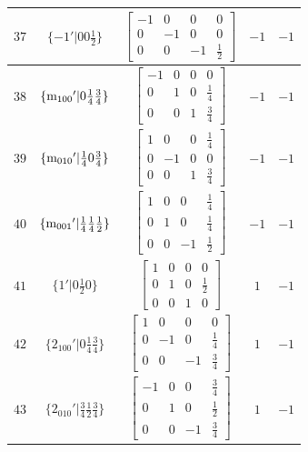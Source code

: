 \documentclass[fleqn,8pt]{jsarticle}
\begin{document}
\begin{longtable}{ccccc}
$ 37 $ & $ \{-1{}'|0 0 \frac{1}{2}\} $ & $ \begin{bmatrix} -1 & 0 & 0 & 0 \\ 0 & -1 & 0 & 0 \\ 0 & 0 & -1 & \frac{1}{2} \end{bmatrix} $ & $ -1 $ & $ -1 $ \\ \hline
$ 38 $ & $ \{{\rm m}_{100}{}'|0 \frac{1}{4} \frac{3}{4}\} $ & $ \begin{bmatrix} -1 & 0 & 0 & 0 \\ 0 & 1 & 0 & \frac{1}{4} \\ 0 & 0 & 1 & \frac{3}{4} \end{bmatrix} $ & $ -1 $ & $ -1 $ \\ \hline
$ 39 $ & $ \{{\rm m}_{010}{}'|\frac{1}{4} 0 \frac{3}{4}\} $ & $ \begin{bmatrix} 1 & 0 & 0 & \frac{1}{4} \\ 0 & -1 & 0 & 0 \\ 0 & 0 & 1 & \frac{3}{4} \end{bmatrix} $ & $ -1 $ & $ -1 $ \\ \hline
$ 40 $ & $ \{{\rm m}_{001}{}'|\frac{1}{4} \frac{1}{4} \frac{1}{2}\} $ & $ \begin{bmatrix} 1 & 0 & 0 & \frac{1}{4} \\ 0 & 1 & 0 & \frac{1}{4} \\ 0 & 0 & -1 & \frac{1}{2} \end{bmatrix} $ & $ -1 $ & $ -1 $ \\ \hline
$ 41 $ & $ \{1{}'|0 \frac{1}{2} 0\} $ & $ \begin{bmatrix} 1 & 0 & 0 & 0 \\ 0 & 1 & 0 & \frac{1}{2} \\ 0 & 0 & 1 & 0 \end{bmatrix} $ & $ 1 $ & $ -1 $ \\ \hline
$ 42 $ & $ \{2{}_{100}{}'|0 \frac{1}{4} \frac{3}{4}\} $ & $ \begin{bmatrix} 1 & 0 & 0 & 0 \\ 0 & -1 & 0 & \frac{1}{4} \\ 0 & 0 & -1 & \frac{3}{4} \end{bmatrix} $ & $ 1 $ & $ -1 $ \\ \hline
$ 43 $ & $ \{2{}_{010}{}'|\frac{3}{4} \frac{1}{2} \frac{3}{4}\} $ & $ \begin{bmatrix} -1 & 0 & 0 & \frac{3}{4} \\ 0 & 1 & 0 & \frac{1}{2} \\ 0 & 0 & -1 & \frac{3}{4} \end{bmatrix} $ & $ 1 $ & $ -1 $ \\ \hline

\end{longtable}
\end{document}
